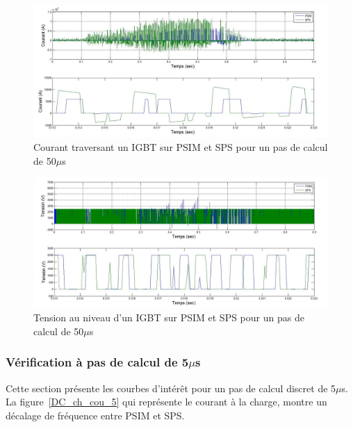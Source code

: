 \documentclass[11pt,letterpaper,final]{report}
\begin{document}
\begin{figure}[htb]
\centering
\includegraphics[scale=0.5]{Fig/DCPDCN/DCPCourantIGBT50u.jpg}
\caption{Courant traversant un IGBT sur PSIM et SPS pour un pas de calcul de 50$\mu$s}
\label{DC_IG_cou_50}
\end{figure}

\begin{figure}[htb]
\centering
\includegraphics[scale=0.5]{Fig/DCPDCN/DCPTensionIGBT50u.jpg}
\caption{Tension au niveau d'un IGBT sur PSIM et SPS pour un pas de calcul de 50$\mu$s}
\label{DC_IG_ten_50}
\end{figure}


\clearpage

\subsubsection{Vérification à pas de calcul de 5$\mu$s}
Cette section présente les courbes d'intérêt pour un pas de calcul discret de 5$\mu$s. La figure~\ref{DC_ch_cou_5} qui représente le courant à la charge, montre un décalage de fréquence entre PSIM et SPS. 
\end{document}
